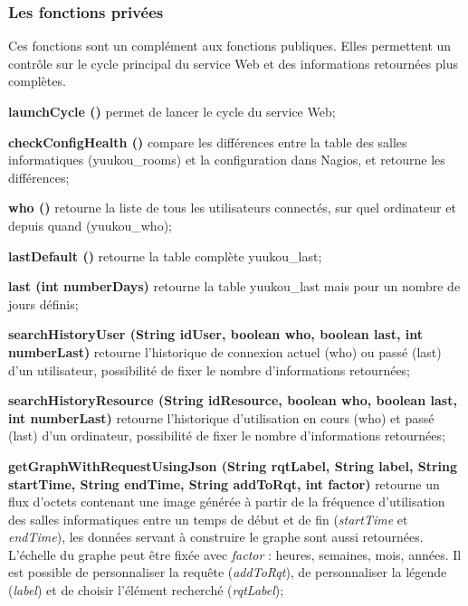 \subsubsection{Les fonctions priv\'ees}

Ces fonctions sont un compl\'ement aux fonctions publiques.
Elles permettent un contr\^ole sur le cycle principal du service Web et des informations retourn\'ees plus compl\`etes.

\begin{longdescription}
	\item[\textbf{launchCycle ()}] permet de lancer le cycle du service Web;
	\item[\textbf{checkConfigHealth ()}] compare les diff\'erences entre la table des salles informatiques (\textsf{yuukou\_rooms}) et la configuration dans Nagios, et retourne les diff\'erences;
	\item[\textbf{who ()}] retourne la liste de tous les utilisateurs connect\'es, sur quel ordinateur et depuis quand (\textsf{yuukou\_who});
	\item[\textbf{lastDefault ()}] retourne la table compl\`ete \textsf{yuukou\_last};
	\item[\textbf{last (int numberDays)}] retourne la table \textsf{yuukou\_last} mais pour un nombre de jours d\'efinis;
	\item[\textbf{searchHistoryUser (String idUser, boolean who, boolean last, int numberLast)}] retourne l'historique de connexion actuel (who) ou pass\'e (last) d'un utilisateur, possibilit\'e de fixer le nombre d'informations retourn\'ees;
	\item[\textbf{searchHistoryResource (String idResource, boolean who, boolean last, int numberLast)}] retourne l'historique d'utilisation en cours (who) et pass\'e (last) d'un ordinateur, possibilit\'e de fixer le nombre d'informations retourn\'ees;
	\item[\textbf{getGraphWithRequestUsingJson (String rqtLabel, String label, String startTime, String endTime, String addToRqt, int factor)}] retourne un flux d'octets contenant une image g\'en\'er\'ee \`a partir de la fr\'equence d'utilisation des salles informatiques entre un temps de d\'ebut et de fin (\textit{startTime} et \textit{endTime}), les donn\'ees servant \`a construire le graphe sont aussi retourn\'ees. L'\'echelle du graphe peut \^etre fix\'ee avec \textit{factor} : heures, semaines, mois, ann\'ees.
Il est possible de personnaliser la requ\^ete (\textit{addToRqt}), de personnaliser la l\'egende (\textit{label}) et de choisir l'\'el\'ement recherch\'e (\textit{rqtLabel});

\end{longdescription}

